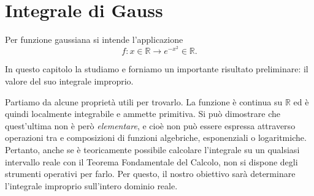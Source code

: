 
\chapter{Integrale di Gauss}

\begin{Def}
	Per funzione gaussiana si intende l'applicazione
	\[
		f: x \in \mathbb{R} \to e^{-x^2} \in \mathbb{R}.
	\]
\end{Def}

In questo capitolo la studiamo e forniamo un importante risultato preliminare: il valore del suo integrale improprio.

Partiamo da alcune proprietà utili per trovarlo. La funzione è continua su $\mathbb{R}$ ed è quindi localmente integrabile e ammette primitiva. Si può dimostrare che quest'ultima non è però \textit{elementare}, e cioè non può essere espressa attraverso operazioni tra e composizioni di funzioni algebriche, esponenziali o logaritmiche. Pertanto, anche se è teoricamente possibile calcolare l'integrale su un qualsiasi intervallo reale con il Teorema Fondamentale del Calcolo, non si dispone degli strumenti operativi per farlo. Per questo, il nostro obiettivo sarà determinare l'integrale improprio sull'intero dominio reale.

